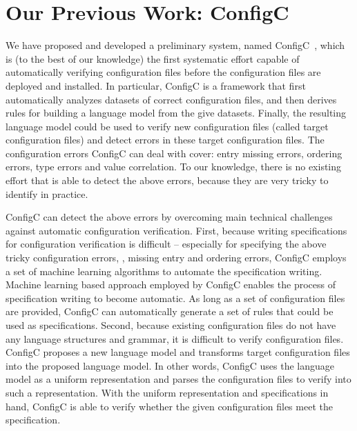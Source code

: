 \section{Our Previous Work: ConfigC}
\label{sec:prelim}

We have proposed and developed a preliminary system, named
ConfigC~\cite{santolucitoCAV}, which is (to the best of
our knowledge) the first systematic effort capable of automatically
verifying configuration files before the configuration files
are deployed and installed.
In particular, ConfigC is a framework that first automatically
analyzes datasets of correct configuration files, 
and then derives rules for building a language model 
from the give datasets.
Finally, the resulting language model could be used to verify 
new configuration files (called target configuration files) and 
detect errors in these target configuration files.
The configuration errors ConfigC can deal with cover:
entry missing errors, ordering errors, type errors and
value correlation.
To our knowledge, there is no existing effort that is able to detect
the above errors, because they are very tricky to identify in
practice.

ConfigC can detect the above errors by overcoming 
main technical challenges against automatic configuration verification.
First, because writing specifications for configuration verification
is difficult -- especially for specifying the above
tricky configuration errors, \eg, missing entry and ordering errors,
ConfigC employs a set of machine learning algorithms to
automate the specification writing. Machine learning based approach
employed by ConfigC enables the process of specification writing to become
automatic. As long as a set of configuration files are provided,
ConfigC can automatically generate a set of rules that could be used
as specifications.
Second, because existing configuration files do not have any language
structures and grammar, it is difficult to verify configuration files.
ConfigC proposes a new language model and transforms target configuration
files into the proposed language model. In other words, ConfigC uses
the language model as a uniform representation and parses the 
configuration files to verify into such a representation.
With the uniform representation and specifications in hand,
ConfigC is able to verify whether the given configuration files
meet the specification.

